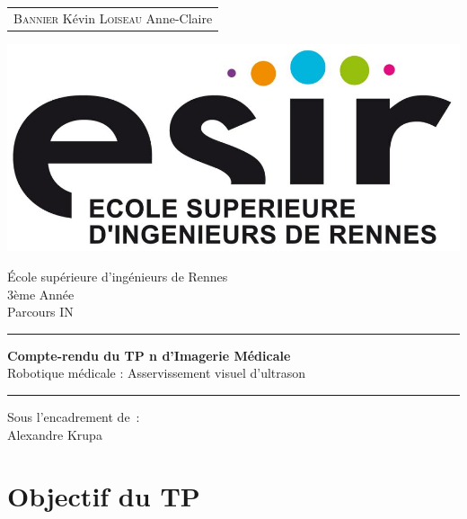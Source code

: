 \documentclass[a4paper,11pt]{article}
\begin{document}
\begin{titlepage}
    \vspace{-20px}
    \begin{tabular}{l}
	\textsc{Bannier} K\'evin
        \textsc{Loiseau} Anne-Claire
    \end{tabular}
    \hfill \vspace{10px}\includegraphics[scale=0.1]{./images/esir.png}\\
    \vfill
    \begin{center}
        \Huge{\'Ecole sup\'erieure d'ing\'enieurs de Rennes}\\
        \vspace{1cm}
        \LARGE{3\`eme Ann\'ee}\\
        \large{Parcours IN}\\
        \vspace{0.5cm}\hrule\vspace{0.5cm}
        \LARGE{\textbf{Compte-rendu du TP n d'Imagerie M\'edicale}}\\
        \Large{Robotique m\'edicale : Asservissement visuel d'ultrason}
        \vspace{0.5cm}\hrule
        \vfill
        \vfill
    \end{center}
    \begin{flushleft}
        \Large{Sous l'encadrement de~:}\\
        \vspace{0.2cm}
        \large{{Alexandre} Krupa}
    \end{flushleft}
    \vfill
\end{titlepage}



\section{Objectif du TP}
\end{document}
